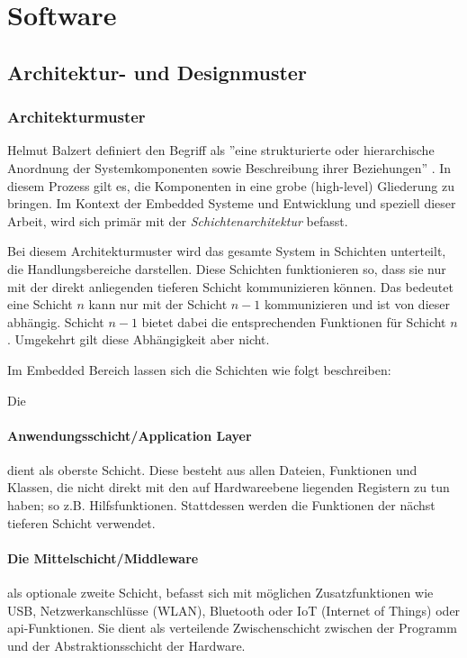 \section{Software}

\subsection{Architektur- und Designmuster}
\subsubsection{Architekturmuster}
Helmut Balzert definiert den Begriff als ''eine strukturierte oder hierarchische Anordnung der Systemkomponenten sowie Beschreibung ihrer Beziehungen'' \cite{balzert2011softwaretechnik2}.
In diesem Prozess gilt es, die Komponenten in eine grobe (high-level) Gliederung zu bringen.
Im Kontext der Embedded Systeme und Entwicklung und speziell dieser Arbeit, wird sich primär mit der \emph{Schichtenarchitektur} befasst.

Bei diesem Architekturmuster wird das gesamte System in Schichten unterteilt, die  Handlungsbereiche darstellen.
Diese Schichten funktionieren so, dass sie nur mit der direkt anliegenden tieferen Schicht kommunizieren können.
Das bedeutet eine Schicht $n$ kann nur mit der Schicht $n-1$ kommunizieren und ist von dieser abhängig.
Schicht $n-1$ bietet dabei die entsprechenden Funktionen für Schicht $n$.
Umgekehrt gilt diese Abhängigkeit aber nicht.

Im Embedded Bereich lassen sich die Schichten wie folgt beschreiben:

Die \paragraph{Anwendungsschicht/Application Layer}
dient als oberste Schicht.
Diese besteht aus allen Dateien, Funktionen und Klassen, die nicht direkt mit den auf Hardwareebene liegenden Registern zu tun haben; so z.B. Hilfsfunktionen.
Stattdessen werden die Funktionen der nächst tieferen Schicht verwendet.

\paragraph{Die Mittelschicht/Middleware}
als optionale zweite Schicht, befasst sich mit möglichen Zusatzfunktionen wie USB, Netzwerkanschlüsse (WLAN), Bluetooth oder IoT (Internet of Things) oder \gls{api}-Funktionen.
Sie dient als verteilende Zwischenschicht zwischen der Programm und der Abstraktionsschicht der Hardware.


